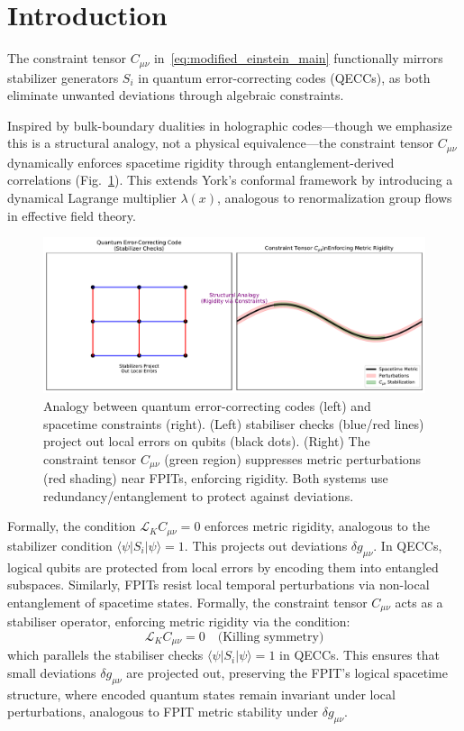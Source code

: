 \documentclass[twocolumn]{article}
\begin{document}
	\FloatBarrier%
	\section{Introduction}
	The constraint tensor $C_{\mu\nu}$ in~\eqref{eq:modified_einstein_main} functionally mirrors stabilizer generators $S_i$ in quantum error-correcting codes (QECCs), as both eliminate unwanted deviations through algebraic constraints.
	
	Inspired by bulk-boundary dualities in holographic codes\cite{almheiri2020}—though we emphasize this is a structural analogy, not a physical equivalence—the constraint tensor $C_{\mu\nu}$ dynamically enforces spacetime rigidity through entanglement-derived correlations (Fig.~\ref{fig:qecc_analogy}). This extends York's conformal framework\cite{york1972} by introducing a dynamical Lagrange multiplier $\lambda(x)$, analogous to renormalization group flows in effective field theory\cite{Donoghue1994}.
	
	\begin{figure}[htbp]
		\centering
		\includegraphics[width=0.95\linewidth]{figures/qecc_analogy.pdf}
		\caption{
			Analogy between quantum error-correcting codes (left) and spacetime constraints (right). 
			(Left) stabiliser checks (blue/red lines) project out local errors on qubits (black dots). 
			(Right) The constraint tensor $C_{\mu\nu}$ (green region) suppresses metric perturbations (red shading) near FPITs, enforcing rigidity. 
			Both systems use redundancy/entanglement to protect against deviations.
		}\label{fig:qecc_analogy}
	\end{figure}
	
	Formally, the condition \(\mathcal{L}_K C_{\mu\nu} = 0\) enforces metric rigidity, analogous to the stabilizer condition \(\langle \psi | S_i | \psi \rangle = 1\). This projects out deviations \(\delta g_{\mu\nu}\). In QECCs, logical qubits are protected from local errors by encoding them into entangled subspaces. Similarly, FPITs resist local temporal perturbations via non-local entanglement of spacetime states. Formally, the constraint tensor $C_{\mu\nu}$ acts as a stabiliser operator, enforcing metric rigidity via the condition:
	\begin{equation}
		\mathcal{L}_K C_{\mu\nu} = 0 \quad \text{(Killing symmetry)}
	\end{equation}
	which parallels the stabiliser checks $\langle \psi | S_i | \psi \rangle = 1$ in QECCs\cite{preskill1998}. This ensures that small deviations $\delta g_{\mu\nu}$ are projected out, preserving the FPIT’s logical spacetime structure, where encoded quantum states remain invariant under local perturbations, analogous to FPIT metric stability under $\delta g_{\mu\nu}$.
	
\end{document}

